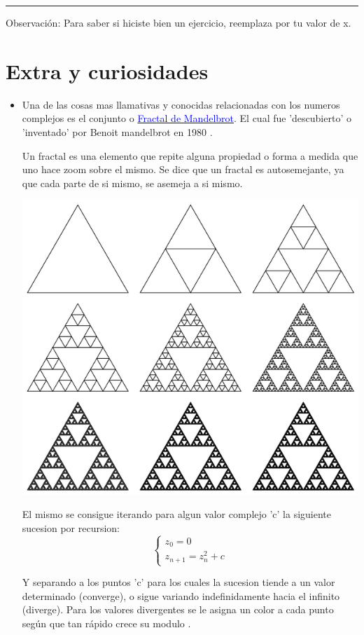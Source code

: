 \documentclass[a4paper,11pt,spanish,sans]{exam}
\begin{document}
\rule[2ex]{\textwidth}{2pt}

Observación: Para saber si hiciste bien un ejercicio, reemplaza por tu valor de x.

\section*{Extra y curiosidades}

\begin{itemize}

\item Una de las cosas mas llamativas y conocidas relacionadas con los numeros complejos es el conjunto o \href{https://www.youtube.com/watch?v=ZDU40eUcTj0}{\textcolor{blue}{Fractal de Mandelbrot}}. 
El cual fue 'descubierto' o 'inventado' por Benoit  mandelbrot en 1980 .

Un fractal es una elemento que repite alguna propiedad o forma a medida que uno hace zoom sobre el mismo. Se dice que un fractal es autosemejante, ya que cada parte de si mismo, se asemeja a si mismo.

\begin{minipage}{0.5\textwidth}
	\centering
	\includegraphics[width= 0.7\linewidth]{serptriang.png}
	\label{fig:univerise}
\end{minipage}
\begin{minipage}{0.5\textwidth}
El mismo se consigue iterando para algun valor complejo 'c' la siguiente sucesion por recursion: 
\[\begin{cases}
z_0=0\\
z_{n+1}=z_{n}^2+c
\end{cases}
\]

Y separando a los puntos 'c' para los cuales la sucesion tiende a un valor determinado (converge), o sigue variando indefinidamente hacia el infinito (diverge).
Para los valores divergentes se le asigna un color a cada punto según que tan rápido crece su modulo .
\end{minipage}


\end{itemize}
\end{document}
